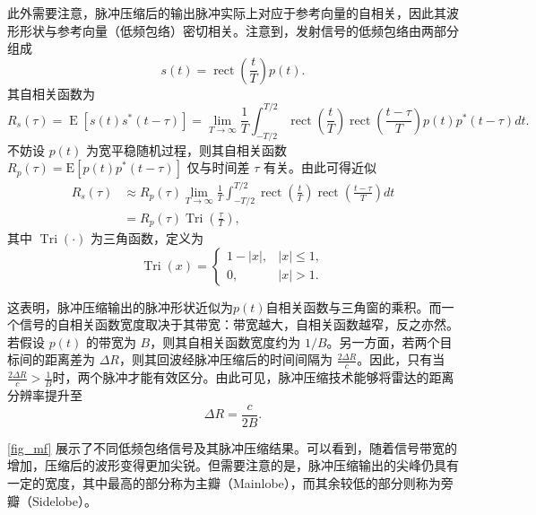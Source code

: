 此外需要注意，脉冲压缩后的输出脉冲实际上对应于参考向量的自相关，因此其波形形状与参考向量（低频包络）密切相关。注意到，发射信号的低频包络由两部分组成
\[
    s(t) = \operatorname{rect}\left( \frac{t}{T} \right) p(t).
\]
其自相关函数为
\[
    R_s(\tau) = \operatorname{E}\left[ s(t)s^*(t-\tau)\right]
    = \lim_{T \rightarrow \infty } \frac{1}{T} \int_{-T/2}^{T/2} \operatorname{rect}\left( \frac{t}{T} \right)
    \operatorname{rect}\left( \frac{t-\tau}{T} \right)
    p(t)p^*(t-\tau)dt.
\]
不妨设 \(p(t)\) 为宽平稳随机过程，则其自相关函数\( R_p(\tau) = \mathrm{E}[p(t)p^*(t-\tau)] \) 仅与时间差 \(\tau\) 有关。由此可得近似
\[
    \begin{split}
        R_s(\tau) & \approx R_p(\tau)
        \lim_{T \rightarrow \infty } \frac{1}{T} \int_{-T/2}^{T/2}
        \operatorname{rect}\left( \frac{t}{T} \right)
        \operatorname{rect}\left( \frac{t-\tau}{T} \right) dt                    \\
                  & = R_p(\tau) \operatorname{Tri}\left( \frac{\tau}{T} \right),
    \end{split}
\]
其中 \(\operatorname{Tri}(\cdot)\) 为三角函数，定义为
\[
    \operatorname{Tri}(x) =
    \begin{cases}
        1-|x|, & |x|\leq 1, \\
        0,     & |x|>1.
    \end{cases}
\]

这表明，脉冲压缩输出的脉冲形状近似为\( p(t) \)自相关函数与三角窗的乘积。而一个信号的自相关函数宽度取决于其带宽：带宽越大，自相关函数越窄，反之亦然。若假设 \(p(t)\) 的带宽为 \(B\)，则其自相关函数宽度约为 \(1/B\)。另一方面，若两个目标间的距离差为 \(\Delta R\)，则其回波经脉冲压缩后的时间间隔为 \(\frac{2\Delta R}{c}\)。因此，只有当\(\frac{2\Delta R}{c} > \frac{1}{B}\)时，两个脉冲才能有效区分。由此可见，脉冲压缩技术能够将雷达的距离分辨率提升至
\[
    \Delta R = \frac{c}{2B}.
\]

\cref{fig_mf} 展示了不同低频包络信号及其脉冲压缩结果。可以看到，随着信号带宽的增加，压缩后的波形变得更加尖锐。但需要注意的是，脉冲压缩输出的尖峰仍具有一定的宽度，其中最高的部分称为主瓣（Mainlobe），而其余较低的部分则称为旁瓣（Sidelobe）。

